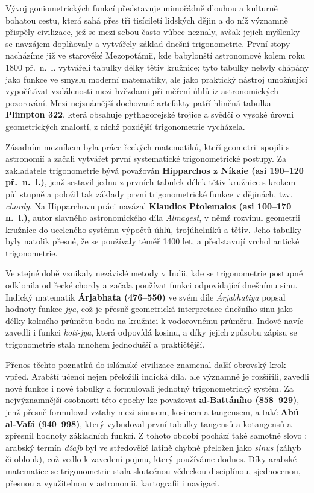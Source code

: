 \documentclass[12pt,a4paper]{article}
\begin{document}
\begin{historicalbox}
Vývoj goniometrických funkcí představuje mimořádně dlouhou a kulturně bohatou cestu, 
která sahá přes tři tisíciletí lidských dějin a do níž významně přispěly civilizace, jež se 
mezi sebou často vůbec neznaly, avšak jejich myšlenky se navzájem doplňovaly a vytvářely 
základ dnešní trigonometrie. První stopy nacházíme již ve starověké Mezopotámii, kde 
babylonští astronomové kolem roku 1800 př.~n.~l. vytvářeli tabulky délky tětiv kružnice; 
tyto tabulky nebyly chápány jako funkce ve smyslu moderní matematiky, ale jako praktický 
nástroj umožňující vypočítávat vzdálenosti mezi hvězdami při měření úhlů iz astronomických 
pozorování. Mezi nejznámější dochované artefakty patří hliněná tabulka \textbf{Plimpton 322}, 
která obsahuje pythagorejské trojice a svědčí o vysoké úrovni geometrických znalostí, 
z nichž pozdější trigonometrie vycházela.

Zásadním mezníkem byla práce řeckých matematiků, kteří geometrii spojili s astronomií 
a začali vytvářet první systematické trigonometrické postupy. Za zakladatele trigonometrie 
bývá považován \textbf{Hipparchos z Níkaie (asi 190–120 př.~n.~l.)}, jenž sestavil jednu z prvních 
tabulek délek tětiv kružnice s krokem půl stupně a položil tak základy první trigonometrické 
funkce v dějinách, tzv. \emph{chordy}. Na Hipparchovu práci navázal \textbf{Klaudios Ptolemaios 
(asi 100–170 n.~l.)}, autor slavného astronomického díla \textit{Almagest}, v němž rozvinul 
geometrii kružnice do uceleného systému výpočtů úhlů, trojúhelníků a tětiv. Jeho tabulky 
byly natolik přesné, že se používaly téměř 1400 let, a představují vrchol antické trigonometrie.

Ve stejné době vznikaly nezávislé metody v Indii, kde se trigonometrie postupně odklonila od 
řecké chordy a začala používat funkci odpovídající dnešnímu sinu. Indický matematik 
\textbf{Árjabhata (476–550)} ve svém díle \textit{Árjabhatiya} popsal hodnoty funkce \emph{jya}, což je 
přesně geometrická interpretace dnešního sinu jako délky kolmého průmětu bodu na kružnici 
k vodorovnému průměru. Indové navíc zavedli i funkci \emph{koti-jya}, která odpovídá kosinu, 
a díky jejich způsobu zápisu se trigonometrie stala mnohem jednodušší a praktičtější.

Přenos těchto poznatků do islámské civilizace znamenal další obrovský krok vpřed. Arabští 
učenci nejen přeložili indická díla, ale významně je rozšířili, zavedli nové funkce i nové 
tabulky a formulovali jednotný trigonometrický systém. Za nejvýznamnější osobnosti této 
epochy lze považovat \textbf{al-Battáního (858–929)}, jenž přesně formuloval vztahy mezi 
sinusem, kosinem a tangensem, a také \textbf{Abú al-Vafá (940–998)}, který vybudoval první 
tabulky tangensů a kotangensů a zpřesnil hodnoty základních funkcí. Z tohoto období pochází 
také samotné slovo : arabský termín \emph{džajb} byl ve středověké latině chybně 
přeložen jako \emph{sinus} (záhyb či oblouk), což vedlo k zavedení pojmu, který používáme 
dodnes. Díky arabské matematice se trigonometrie stala skutečnou vědeckou disciplínou, 
sjednocenou, přesnou a využitelnou v astronomii, kartografii i navigaci.


\end{historicalbox}
\end{document}
